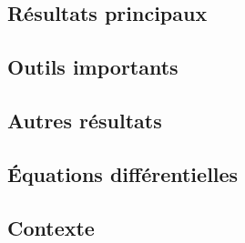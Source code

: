 \documentclass[11pt,a4paper]{article}
\begin{document}
\subsection*{Résultats principaux}


\subsection*{Outils importants}


\subsection*{Autres résultats}

\newpage
\begin{center}  
\section*{Équations différentielles} 
\end{center}



\subsection*{Contexte}
\end{document}
